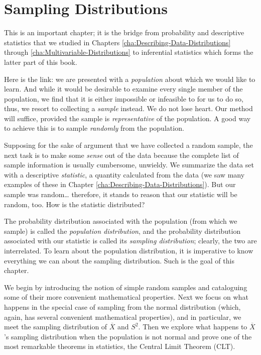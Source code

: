 \documentclass[captions=tableheading]{scrbook}
\begin{document}
\chapter{Sampling Distributions}
\label{sec-8}

\label{cha:Sampling-Distributions}

\noindent This is an important chapter; it is the bridge from probability and descriptive statistics that we studied in Chapters \ref{cha:Describing-Data-Distributions} through \ref{cha:Multivariable-Distributions} to inferential statistics which forms the latter part of this book.

Here is the link: we are presented with a \emph{population} about which we would like to learn. And while it would be desirable to examine every single member of the population, we find that it is either impossible or infeasible to for us to do so, thus, we resort to collecting a \emph{sample} instead. We do not lose heart. Our method will suffice, provided the sample is \emph{representative} of the population. A good way to achieve this is to sample \emph{randomly} from the population.

Supposing for the sake of argument that we have collected a random sample, the next task is to make some \emph{sense} out of the data because the complete list of sample information is usually cumbersome, unwieldy. We summarize the data set with a descriptive \emph{statistic}, a quantity calculated from the data (we saw many examples of these in Chapter \ref{cha:Describing-Data-Distributions}). But our sample was random\ldots{} therefore, it stands to reason that our statistic will be random, too. How is the statistic distributed?

The probability distribution associated with the population (from which we sample) is called the \emph{population distribution}, and the probability distribution associated with our statistic is called its \emph{sampling distribution}; clearly, the two are interrelated. To learn about the population distribution, it is imperative to know everything we can about the sampling distribution. Such is the goal of this chapter.

We begin by introducing the notion of simple random samples and cataloguing some of their more convenient mathematical properties. Next we focus on what happens in the special case of sampling from the normal distribution (which, again, has several convenient mathematical properties), and in particular, we meet the sampling distribution of \(\overline{X}\) and \(S^{2}\). Then we explore what happens to \(\overline{X}\)'s sampling distribution when the population is not normal and prove one of the most remarkable theorems in statistics, the Central Limit Theorem (CLT).
\end{document}
